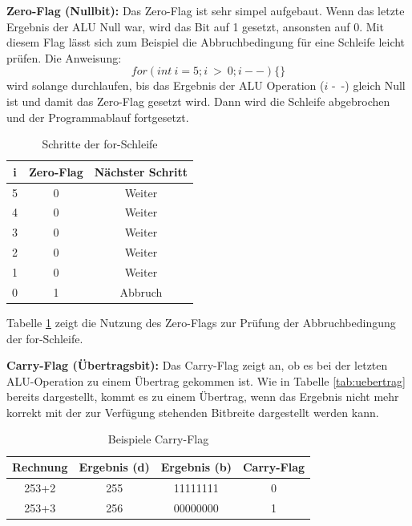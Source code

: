 \documentclass[a4paper,12pt]{article}
\begin{document}
\par\smallskip\noindent \textbf{Zero-Flag (Nullbit):} Das Zero-Flag ist sehr simpel aufgebaut. Wenn das letzte Ergebnis der ALU Null war, wird das Bit auf 1 gesetzt, ansonsten auf 0. Mit diesem Flag lässt sich zum Beispiel die Abbruchbedingung für eine Schleife leicht prüfen. Die Anweisung: $$for(int \ i=5;i \ > \ 0;i--)\{\}$$ wird solange durchlaufen, bis das Ergebnis der ALU Operation ($i$ -\ -) gleich Null ist und damit das Zero-Flag gesetzt wird. Dann wird die Schleife abgebrochen und der Programmablauf fortgesetzt. \cite[S.95]{mikroprozessortechnik2011}
\begin{table}[!htb]
\centering
\begin{tabular}{|c|c|c|}
\hline

i & Zero-Flag & Nächster Schritt \\ \hline
5 & 0         & Weiter           \\ \hline
4 & 0         & Weiter           \\ \hline
3 & 0         & Weiter           \\ \hline
2 & 0         & Weiter           \\ \hline
1 & 0         & Weiter           \\ \hline
0 & 1         & Abbruch          \\ \hline
\end{tabular}
\caption{Schritte der for-Schleife}
\label{forschleife}
\end{table}

\noindent Tabelle \ref{forschleife} zeigt die Nutzung des Zero-Flags zur Prüfung der Abbruchbedingung der for-Schleife. 

\newpage
\noindent \textbf{Carry-Flag (Übertragsbit):} Das Carry-Flag zeigt an, ob es bei der letzten ALU-Operation zu einem Übertrag gekommen ist. Wie in Tabelle \ref{tab:uebertrag} bereits dargestellt, kommt es zu einem Übertrag, wenn das Ergebnis nicht mehr korrekt mit der zur Verfügung stehenden Bitbreite dargestellt werden kann.\cite[S.95]{mikroprozessortechnik2011}


\begin{table}[!htb]
\centering
\begin{tabular}{|c|c|c|c|}
\hline
Rechnung & Ergebnis (d) & Ergebnis (b) & Carry-Flag \\ \hline \hline
253+2    & 255          & 11111111     & 0          \\ \hline \hline
253+3    & 256          & 00000000     & 1          \\ \hline
\end{tabular}
\caption{Beispiele Carry-Flag}
\label{tab:carry}

\end{table}
\end{document}
